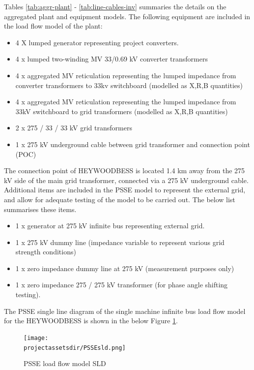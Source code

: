 \documentclass{../grid-link-report}
\newcommand{\projectassetsdir}{../project-assets}
\begin{document}
	Tables \ref{tab:aggr-plant} - \ref{tab:line-cables-inv} summaries the details on the aggregated plant and equipment models. The following equipment are included in the load flow model of the plant:
	
	\begin{itemize}
		\item 4 X lumped generator representing project converters. 
		\item 4 x lumped two-winding MV 33/0.69 kV converter transformers
		\item 4 x aggregated MV reticulation representing the lumped impedance from converter transformers to 33kv switchboard  (modelled as X,R,B quantities)
		\item 4 x aggregated MV reticulation representing the lumped impedance from 33kV switchboard to grid transformers (modelled as X,R,B quantities)		 
		\item 2 x 275 / 33 / 33 kV grid transformers

		\item 1 x 275 kV underground cable between grid transformer and connection point (POC)		
	\end{itemize}


	The connection point of HEYWOODBESS is located 1.4 km away from the 275 kV side of the main grid transformer, connected via a 275 kV underground cable. Additional items are included in the PSSE model to represent the external grid, and allow for adequate testing of the model to be carried out. The below list summarises these items.
	
	\begin{itemize}
		\item 1 x generator at 275 kV infinite bus representing external grid. 
		\item 1 x 275 kV dummy line (impedance variable to represent various grid strength conditions)
		\item 1 x zero impedance dummy line at 275 kV (measurement purposes only)
		\item 1 x zero impedance 275 / 275 kV transformer (for phase angle shifting testing).  
	\end{itemize}
	
	The PSSE single line diagram of the single machine infinite bus load flow model for the HEYWOODBESS is shown in the below Figure \ref{fig:psse-model-sld}.
	
	\begin{figure}[H]
		\centering
		\texttt{[image: \\projectassetsdir/PSSEsld.png]}
		\caption{PSSE load flow model SLD}
		\label{fig:psse-model-sld}
	\end{figure}
\end{document}
